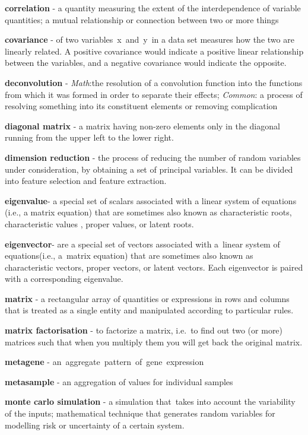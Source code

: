 \documentclass[12pt,]{book}
\theoremstyle{definition}
\theoremstyle{definition}
\theoremstyle{definition}
\theoremstyle{remark}
\begin{document}
\textbf{correlation} - a quantity measuring the extent of the
interdependence of variable quantities; a mutual relationship or
connection between two or more things \citep{corr}

\textbf{covariance} - of two variables~x~and~y~in a data set measures
how the two are linearly related. A positive covariance would indicate a
positive linear relationship between the variables, and a negative
covariance would indicate the opposite. \citep{cov}

\textbf{deconvolution} - \emph{Math}:the resolution of a convolution
function into the functions from which it was formed in order to
separate their effects; \emph{Common}: a process of resolving something
into its constituent elements or removing complication
\citep{deconvolution}

\textbf{diagonal matrix} - a matrix having non-zero elements only in the
diagonal running from the upper left to the lower right. \citep{diag}

\textbf{dimension reduction }- the process of reducing the number of
random variables under consideration, by obtaining a set of principal
variables. It can be divided into feature selection and feature
extraction. \citep{dimred}

\textbf{eigenvalue}- a special set of scalars associated with a linear
system of equations (i.e., a matrix equation) that are sometimes also
known as characteristic roots, characteristic values , proper values, or
latent roots. \citep{Weisstein1}

\textbf{eigenvector}- are a special set of vectors associated with
a~linear system of equations(i.e., a~matrix equation) that are sometimes
also known as characteristic vectors, proper vectors, or latent vectors.
Each eigenvector is paired with a corresponding eigenvalue.
\citep{Weisstein2}

\textbf{matrix} - a rectangular array of quantities or expressions in
rows and columns that is treated as a single entity and manipulated
according to particular rules. \citep{matrix}

\textbf{matrix factorisation} - to factorize a matrix, i.e.~to find out
two (or more) matrices such that when you multiply them you will get
back the original matrix. \citep{factMat}

\textbf{metagene} - an~aggregate~pattern~of~gene~expression
\citep{metag}

\textbf{metasample }- an aggregation of values for individual samples

\textbf{monte carlo simulation} - a simulation that~takes into account
the variability of the inputs; mathematical technique that generates
random variables for modelling risk or uncertainty of a certain system.
\citep{monte}
\end{document}
